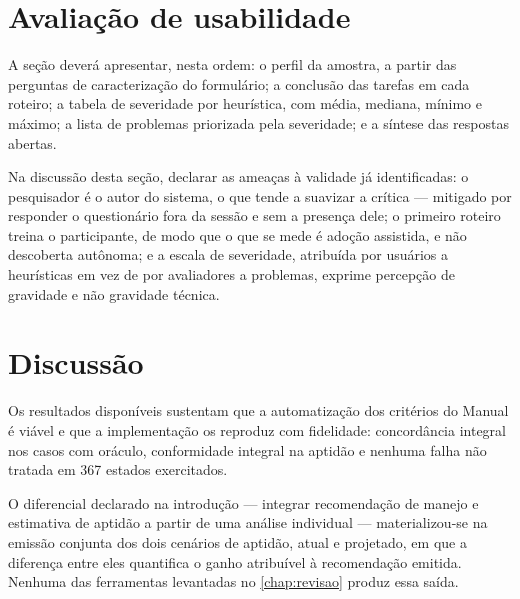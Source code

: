 \section{Avaliação de usabilidade}


A seção deverá apresentar, nesta ordem: o perfil da amostra, a partir das perguntas de
caracterização do formulário; a conclusão das tarefas em cada roteiro; a tabela de
severidade por heurística, com média, mediana, mínimo e máximo; a lista de problemas
priorizada pela severidade; e a síntese das respostas abertas.


Na discussão desta seção, declarar as ameaças à validade já identificadas: o pesquisador
é o autor do sistema, o que tende a suavizar a crítica --- mitigado por responder o
questionário fora da sessão e sem a presença dele; o primeiro roteiro treina o
participante, de modo que o que se mede é adoção assistida, e não descoberta autônoma; e
a escala de severidade, atribuída por usuários a heurísticas em vez de por avaliadores a
problemas, exprime percepção de gravidade e não gravidade técnica.

\section{Discussão}

Os resultados disponíveis sustentam que a automatização dos critérios do Manual é
viável e que a implementação os reproduz com fidelidade: concordância integral nos casos
com oráculo, conformidade integral na aptidão e nenhuma falha não tratada em 367 estados
exercitados.

O diferencial declarado na introdução --- integrar recomendação de manejo e estimativa de
aptidão a partir de uma análise individual --- materializou-se na emissão conjunta dos
dois cenários de aptidão, atual e projetado, em que a diferença entre eles quantifica o
ganho atribuível à recomendação emitida. Nenhuma das ferramentas levantadas no
\cref{chap:revisao} produz essa saída.

